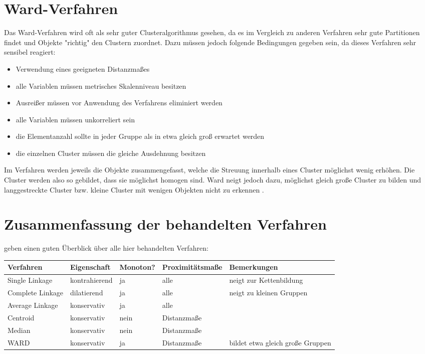 \section{Ward-Verfahren}
Das Ward-Verfahren wird oft als sehr guter Clusteralgorithmus gesehen, da es im Vergleich zu anderen Verfahren sehr gute Partitionen findet und Objekte "richtig" den Clustern zuordnet. Dazu müssen jedoch folgende Bedingungen gegeben sein, da dieses Verfahren sehr sensibel reagiert: 

\begin{itemize}
	\item Verwendung eines geeigneten Distanzmaßes
	\item alle Variablen müssen metrisches Skalenniveau besitzen
	\item Ausreißer müssen vor Anwendung des Verfahrens eliminiert werden
	\item alle Variablen müssen unkorreliert sein
	\item die Elementanzahl sollte in jeder Gruppe als in etwa gleich groß erwartet werden
	\item die einzelnen Cluster müssen die gleiche Ausdehnung besitzen
\end{itemize}

Im Verfahren werden jeweils die Objekte zusammengefasst, welche die Streuung innerhalb eines Cluster möglichst wenig erhöhen. Die Cluster werden also so gebildet, dass sie möglichst homogen sind. Ward neigt jedoch dazu, möglichst gleich große Cluster zu bilden und langgestreckte Cluster bzw. kleine Cluster mit wenigen Objekten nicht zu erkennen \citep[Vgl.][S. 484]{Backhaus.2016}. \\

\section{Zusammenfassung der behandelten Verfahren}
\citet[S. 489]{Backhaus.2016} geben einen guten Überblick über alle hier behandelten Verfahren: \\
\begin{tabular}{|l|l|l|l|p{3.7cm}|}
	\hline
	\rowcolor{babyblueeyes}Verfahren & Eigenschaft & Monoton? & Proximitätsmaße & Bemerkungen \\ \hline
	\rowcolor{beaublue}Single Linkage & kontrahierend & ja & alle & neigt zur Kettenbildung \\ \hline
	\rowcolor{beaublue}Complete Linkage & dilatierend & ja & alle & neigt zu kleinen Gruppen \\ \hline	
	\rowcolor{beaublue}Average Linkage & konservativ & ja & alle & \\ \hline
	\rowcolor{beaublue}Centroid & konservativ & nein & Distanzmaße & \\ \hline
	\rowcolor{beaublue}Median & konservativ & nein & Distanzmaße & \\ \hline
	\rowcolor{beaublue}WARD & konservativ & ja & Distanzmaße & bildet etwa gleich große Gruppen \\ \hline
\end{tabular}
